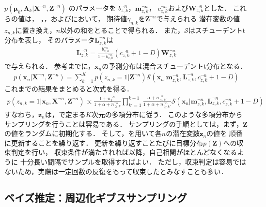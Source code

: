 $p(\bm\mu_k, \bm\Lambda_k|\bm{X}^{\neg{n}},\bm{Z}^{\neg{n}})$
のパラメータを
$b_{z,k}^{\neg{n}}$，$\bm{m}_{z,k}^{\neg{n}}$，
$c_{z,k}^{\neg{n}}$および$\bm{W}_{z,k}^{\neg{n}}$とした．
これらの値は，
，，およびにおいて，
期待値$\gamma_{n,k}$を$\bm{Z}^{\neg{n}}$で与えられる
潜在変数の値$z_{n,k}$に置き換え，$n$以外の和をとることで得られる．
また，$\mathcal{S}$はスチューデントt分布を表し，
そのパラメータ$\bm{L}_{z,k}^{\neg{n}}$は
\begin{eqnarray}
 \bm{L}_{z,k}^{\neg{n}} 
  = \frac{b_{z,k}^{\neg{n}}}{1 + b_{z,k}^{\neg{n}}} \left(c_{z,k}^{\neg{n}} + 1 - D\right) \bm{W}_{z,k}^{\neg{n}}
  \label{eq:lk}
\end{eqnarray}
で与えられる．
参考までに，$\bm{x}_{n}$の予測分布は混合スチューデントt分布となる．
\begin{eqnarray}
p(\bm{x}_{n} | \bm{X}^{\neg{n}}, \bm{Z}^{\neg{n}})
=
 \sum_{k=1}^{K}
 p(z_{n,k}=1 | \bm{Z}^{\neg{n}})
 \mathcal{S}\left(\bm{x}_{n}|\bm{m}_{z,k}^{\neg{n}}, 
	     \bm{L}_{z,k}^{\neg{n}}, c_{z,k}^{\neg{n}} + 1 - D\right)
\end{eqnarray}
これまでの結果をまとめると次式を得る．
\begin{eqnarray}
 p(z_{n,k}=1 | \bm{x}_{n}, \bm{X}^{\neg{n}}, \bm{Z}^{\neg{n}})
  \propto
 \frac{1 + n_k^{\neg{n}}}
      {1 + \alpha + n_{\ge k}^{\neg{n}}}     
 \prod_{k'=1}^{k-1}
 \frac{\alpha + n_{> k'}^{\neg{n}}}
      {1 + \alpha + n_{\ge k'}^{\neg{n}}}
 \mathcal{S}\left(\bm{x}_{n}|\bm{m}_{z,k}^{\neg{n}}, 
	     \bm{L}_{z,k}^{\neg{n}}, c_{z,k}^{\neg{n}} + 1 - D \right)
 \label{eq:pzdn}
\end{eqnarray}
すなわち，$\bm{z}_{n}$は，で定まる$K$次元の多項分布に従う．
このような多項分布からサンプリングを行うことは容易である．
サンプリングの手順としては，まず，$\bm{Z}$の値をランダムに初期化する．
そして，を用いて各$n$の潜在変数$\bm{z}_{n}$の値を
順番に更新することを繰り返す．
更新を繰り返すことたびに目標分布$p(\bm{Z})$への収束判定を行い，
収束条件が満たされれば以降，自己相関がほとんどなくなるように
十分長い間隔でサンプルを取得すればよい．
ただし，収束判定は容易ではないため，実際は一定回数の反復をもって収束したとみなすことも多い．

\subsection{ベイズ推定：周辺化ギブスサンプリング}


